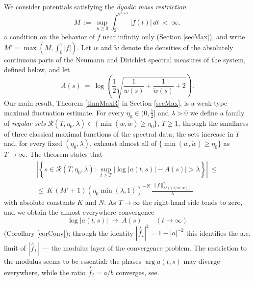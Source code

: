 \documentclass[11pt,twoside,reqno]{amsart}
\def\ti{\tilde}
\def\to{\rightarrow}
\def \nlhat {\overset{\ \curlywedge}}
\def\R{{\mathbb R}}
\def\RR{{\mathcal{R}}}
\theoremstyle{plain}
\numberwithin{equation}{section}
\begin{document}
We consider potentials satisfying the {\it dyadic mass restriction}
$$M\ :=\ \sup_{n\geq0}\int_{2^n}^{2^{n+1}}|f(t)|\,dt\ <\ \infty,$$
a condition on the behavior of $f$ near infinity only (Section \ref{secMax}), and write $M'=\max\left(M,\int_0^1|f|\right)$. Let $w$ and $\ti w$ denote the densities of the absolutely continuous parts of the Neumann and Dirichlet spectral measures of the system, defined below, and let
$$A(s)\ =\ \log\left(\frac12\sqrt{\frac1{w(s)}+\frac1{\ti w(s)}+2}\right).$$
Our main result, Theorem \ref{thmMaxR} in Section \ref{secMax}, is a weak-type maximal fluctuation estimate. For every $\eta_0\in(0,\tfrac12]$ and $\lambda>0$ we define a family of {\it regular sets} $\RR(T,\eta_0,\lambda)\subset\{\min(w,\ti w)\geq\eta_0\}$, $T\geq1$, through the smallness of three classical maximal functions of the spectral data; the sets increase in $T$ and, for every fixed $(\eta_0,\lambda)$, exhaust almost all of $\{\min(w,\ti w)\geq\eta_0\}$ as $T\to\infty$. The theorem states that
$$\begin{gathered}\left|\left\{s\in\RR(T,\eta_0,\lambda):\ \sup_{t\geq T}\big|\log|a(t,s)|-A(s)\big|>\lambda\right\}\right|\ \leq\\ \leq\ K\,(M'+1)\left(\eta_0\min(\lambda,1)\right)^{-N}\,\frac{\|f\|^2_{L^2((T/32,\infty))}}{\lambda}\end{gathered}$$
with absolute constants $K$ and $N$. As $T\to\infty$ the right-hand side tends to zero, and we obtain the almost everywhere convergence
$$\log|a(t,s)|\ \longrightarrow\ A(s)\qquad(t\to\infty)$$
(Corollary \ref{corConv}); through the identity $|\nlhat f_t|^2=1-|a|^{-2}$ this identifies the a.e. limit of $|\nlhat f_t\,|$ --- the modulus layer of the convergence problem. The restriction to the modulus seems to be essential: the phases $\arg a(t,s)$ may diverge everywhere, while the ratio $\nlhat f_t=a/b$ converges, see\cite{Den2}.

\end{document}
